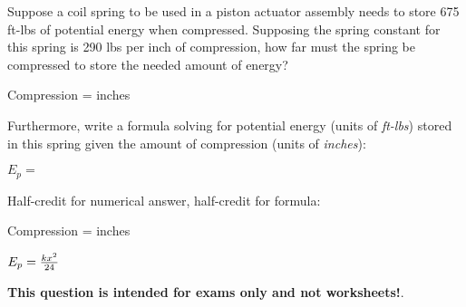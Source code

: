 

Suppose a coil spring to be used in a piston actuator assembly needs to store 675 ft-lbs of potential energy when compressed.  Supposing the spring constant for this spring is 290 lbs per inch of compression, how far must the spring be compressed to store the needed amount of energy?

\vskip 10pt

Compression = \underbar{\hskip 50pt} inches

\vskip 10pt

Furthermore, write a formula solving for potential energy (units of {\it ft-lbs}) stored in this spring given the amount of compression (units of {\it inches}):

\vskip 10pt

$E_p = $







Half-credit for numerical answer, half-credit for formula:

\vskip 10pt

Compression =  inches

\vskip 10pt

$E_p = {kx^2 \over 24}$







{\bf This question is intended for exams only and not worksheets!}.



